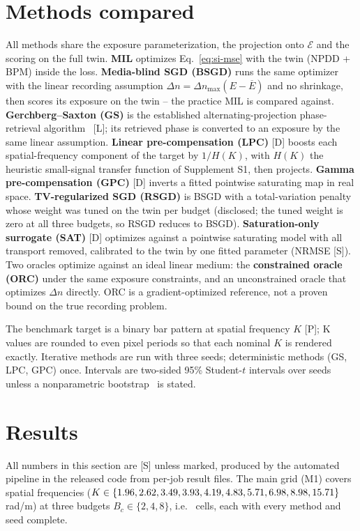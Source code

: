 \documentclass{optica-article}
\begin{document}
\section{Methods compared}
\label{sec:method}
All methods share the exposure parameterization, the projection onto
$\mathcal{E}$ and the scoring on the full twin. \textbf{MIL} optimizes
Eq.~\eqref{eq:si-mse} with the twin (NPDD + BPM) inside the loss.
\textbf{Media-blind SGD (BSGD)} runs the same optimizer with the linear
recording assumption $\Delta n=\Delta n_{\max}(E-\overline{E})$ and no
shrinkage, then scores its exposure on the twin -- the practice MIL is
compared against. \textbf{Gerchberg--Saxton (GS)} is the established
alternating-projection phase-retrieval algorithm~\cite{gerchberg1972practical,fienup1982phase}
[L]; its retrieved phase is converted to an exposure by the same linear
assumption. \textbf{Linear pre-compensation (LPC)} [D] boosts each
spatial-frequency component of the target by $1/H(K)$, with $H(K)$ the
heuristic small-signal transfer function of Supplement S1, then projects.
\textbf{Gamma pre-compensation (GPC)} [D] inverts a fitted pointwise
saturating map in real space. \textbf{TV-regularized SGD (RSGD)} is BSGD
with a total-variation penalty whose weight was tuned on the twin per budget
(disclosed; the tuned weight is zero at all three budgets, so RSGD reduces
to BSGD). \textbf{Saturation-only surrogate (SAT)} [D] optimizes against a
pointwise saturating model with all transport removed, calibrated to the
twin by one fitted parameter (NRMSE \SATFitNRMSE{} [S]). Two oracles
optimize against an ideal linear medium: the \textbf{constrained oracle
(ORC)} under the same exposure constraints, and an unconstrained oracle
that optimizes $\Delta n$ directly. ORC is a gradient-optimized reference,
not a proven bound on the true recording problem.

The benchmark target is a binary bar pattern at spatial frequency $K$
[P]; K values are rounded to even pixel periods so that each nominal $K$
is rendered exactly. Iterative methods are run with three seeds;
deterministic methods (GS, LPC, GPC) once. Intervals are two-sided 95\%
Student-$t$ intervals over seeds unless a nonparametric
bootstrap~\cite{efron1993bootstrap} is stated.

\section{Results}
\label{sec:results}
All numbers in this section are [S] unless marked, produced by the
automated pipeline in the released code from per-job result files. The
main grid (M1) covers \MOneNK{} spatial frequencies
($K\in\{1.96, 2.62, 3.49, 3.93, 4.19, 4.83, 5.71, 6.98, 8.98, 15.71\}$\,rad/\textmu m) at three budgets
$B_c\in\{2,4,8\}$, i.e.\ \MOneNCells{} cells, each with every method and
seed complete.
\end{document}
